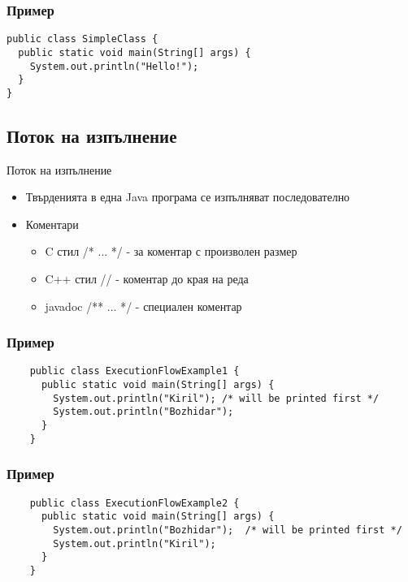 \documentclass{beamer}
\begin{document}
\begin{frame}[fragile]
 \frametitle{Пример}
 \begin{lstlisting}
public class SimpleClass {
  public static void main(String[] args) {
    System.out.println("Hello!");
  }
}
  \end{lstlisting}
\end{frame}

\subsection{Поток на изпълнение}
\begin{frame}{Поток на изпълнение}
  
  \begin{itemize}
    \item Твърденията в една Java програма се изпълняват последователно
    \item Коментари
      
      \begin{itemize}
        \item C стил /* ... */ - за коментар с произволен размер
        \item C++ стил // - коментар до края на реда
        \item javadoc /** ... */ - специален коментар
      \end{itemize}

  \end{itemize}

\end{frame}

\begin{frame}[fragile]
  \frametitle{Пример}
  \begin{lstlisting}
    public class ExecutionFlowExample1 {
      public static void main(String[] args) {
        System.out.println("Kiril"); /* will be printed first */
        System.out.println("Bozhidar");
      }
    }
  \end{lstlisting}
\end{frame}

\begin{frame}[fragile]
  \frametitle{Пример}
  \begin{lstlisting}
    public class ExecutionFlowExample2 {
      public static void main(String[] args) {
        System.out.println("Bozhidar");  /* will be printed first */
        System.out.println("Kiril");
      }
    }
  \end{lstlisting}
\end{frame}
\end{document}
